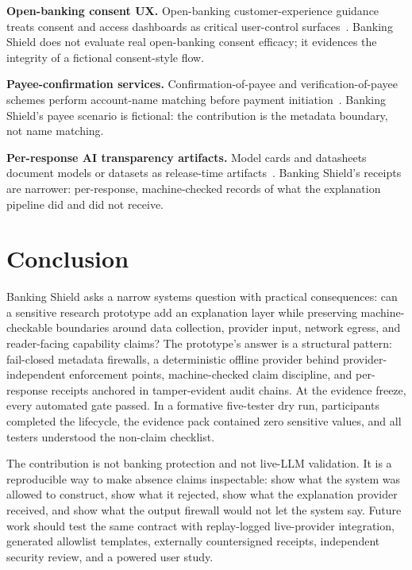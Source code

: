 \documentclass[conference]{IEEEtran}
\newcommand{\sys}{Banking Shield}
\begin{document}
\textbf{Open-banking consent UX.} Open-banking customer-experience guidance
treats consent and access dashboards as critical user-control
surfaces~\cite{openbanking_consent,worldbank_consent}. \sys{} does not evaluate
real open-banking consent efficacy; it evidences the integrity of a fictional
consent-style flow.

\textbf{Payee-confirmation services.} Confirmation-of-payee and
verification-of-payee schemes perform account-name matching before payment
initiation~\cite{payuk_cop,epc_vop}. \sys{}'s payee scenario is fictional: the
contribution is the metadata boundary, not name matching.

\textbf{Per-response AI transparency artifacts.} Model cards and datasheets
document models or datasets as release-time
artifacts~\cite{mitchell2019modelcards,gebru2021datasheets}. \sys{}'s receipts
are narrower: per-response, machine-checked records of what the explanation
pipeline did and did not receive.

\section{Conclusion}

\sys{} asks a narrow systems question with practical consequences: can a sensitive
research prototype add an explanation layer while preserving machine-checkable
boundaries around data collection, provider input, network egress, and
reader-facing capability claims? The prototype's answer is a structural pattern:
fail-closed metadata firewalls, a deterministic offline provider behind
provider-independent enforcement points, machine-checked claim discipline, and
per-response receipts anchored in tamper-evident audit chains. At the evidence
freeze, every automated gate passed. In a formative five-tester dry run,
participants completed the lifecycle, the evidence pack contained zero sensitive
values, and all testers understood the non-claim checklist.

The contribution is not banking protection and not live-LLM validation. It is a
reproducible way to make absence claims inspectable: show what the system was
allowed to construct, show what it rejected, show what the explanation provider
received, and show what the output firewall would not let the system say. Future
work should test the same contract with replay-logged live-provider integration,
generated allowlist templates, externally countersigned receipts, independent
security review, and a powered user study.
\end{document}
